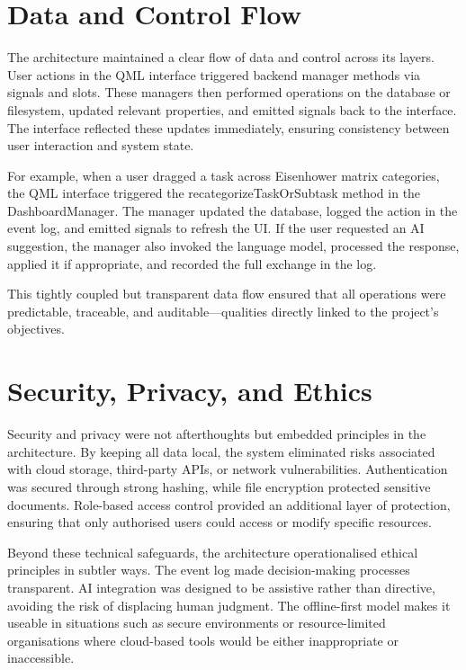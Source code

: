 \documentclass{report}
\begin{document}
\section{Data and Control Flow}

The architecture maintained a clear flow of data and control across its layers. 
User actions in the QML interface triggered backend manager methods via signals and slots. 
These managers then performed operations on the database or filesystem, updated relevant properties, and emitted signals back to the interface. 
The interface reflected these updates immediately, ensuring consistency between user interaction and system state.

For example, when a user dragged a task across Eisenhower matrix categories, the QML interface triggered the recategorizeTaskOrSubtask method in the DashboardManager. 
The manager updated the database, logged the action in the event log, and emitted signals to refresh the UI. 
If the user requested an AI suggestion, the manager also invoked the language model, processed the response, applied it if appropriate, and recorded the full exchange in the log.

This tightly coupled but transparent data flow ensured that all operations were predictable, traceable, and auditable—qualities directly linked to the project's objectives.

\section{Security, Privacy, and Ethics}

Security and privacy were not afterthoughts but embedded principles in the architecture. 
By keeping all data local, the system eliminated risks associated with cloud storage, third-party APIs, or network vulnerabilities. 
Authentication was secured through strong hashing, while file encryption protected sensitive documents. 
Role-based access control provided an additional layer of protection, ensuring that only authorised users could access or modify specific resources.

Beyond these technical safeguards, the architecture operationalised ethical principles in subtler ways. 
The event log made decision-making processes transparent. 
AI integration was designed to be assistive rather than directive, avoiding the risk of displacing human judgment. 
The offline-first model makes it useable in situations such as secure environments or resource-limited organisations where cloud-based tools would be either inappropriate or inaccessible.
\end{document}
